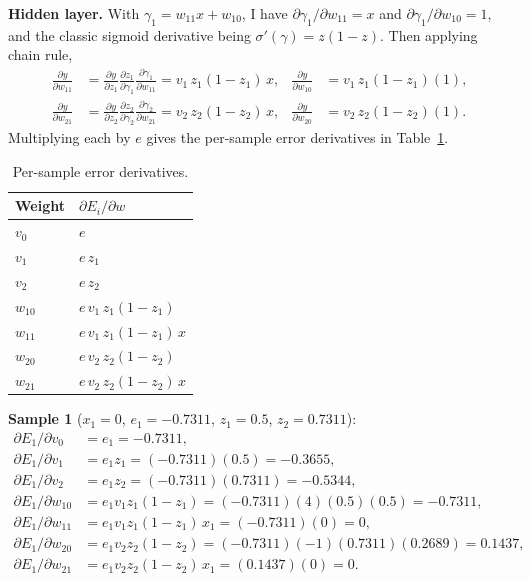 \documentclass[11pt,letterpaper]{article}
\newcommand{\sig}{\sigma}
\newcommand{\pd}[2]{\frac{\partial #1}{\partial #2}}
\begin{document}
\textbf{Hidden layer.} With $\gamma_1=w_{11}x+w_{10}$, I have
$\partial\gamma_1/\partial w_{11}=x$ and $\partial\gamma_1/\partial w_{10}=1$,
and the classic sigmoid derivative being $\sig'(\gamma)=z(1-z)$. Then applying chain rule,
\begin{align*}
\pd{y}{w_{11}}&=\pd{y}{z_1}\pd{z_1}{\gamma_1}\pd{\gamma_1}{w_{11}}
=v_1\,z_1(1-z_1)\,x,
&\pd{y}{w_{10}}&=v_1\,z_1(1-z_1)(1),\\[3pt]
\pd{y}{w_{21}}&=\pd{y}{z_2}\pd{z_2}{\gamma_2}\pd{\gamma_2}{w_{21}}
=v_2\,z_2(1-z_2)\,x,
&\pd{y}{w_{20}}&=v_2\,z_2(1-z_2)(1).
\end{align*}
Multiplying each by $e$ gives the per-sample error derivatives in
Table~\ref{tab:formulas}.

\begin{table}[H]
\centering
\caption{Per-sample error derivatives.}
\label{tab:formulas}
\renewcommand{\arraystretch}{1.35}
\begin{tabular}{ll}
\toprule
Weight & $\partial E_i/\partial w$\\
\midrule
$v_0$    & $e$\\
$v_1$    & $e\,z_1$\\
$v_2$    & $e\,z_2$\\
$w_{10}$ & $e\,v_1\,z_1(1-z_1)$\\
$w_{11}$ & $e\,v_1\,z_1(1-z_1)\,x$\\
$w_{20}$ & $e\,v_2\,z_2(1-z_2)$\\
$w_{21}$ & $e\,v_2\,z_2(1-z_2)\,x$\\
\bottomrule
\end{tabular}
\end{table}

\textbf{Sample 1} ($x_1=0$, $e_1=-0.7311$, $z_1=0.5$, $z_2=0.7311$):
\begin{align*}
\partial E_1/\partial v_0&=e_1=-0.7311,\\
\partial E_1/\partial v_1&=e_1z_1=(-0.7311)(0.5)=-0.3655,\\
\partial E_1/\partial v_2&=e_1z_2=(-0.7311)(0.7311)=-0.5344,\\
\partial E_1/\partial w_{10}&=e_1v_1z_1(1-z_1)=(-0.7311)(4)(0.5)(0.5)=-0.7311,\\
\partial E_1/\partial w_{11}&=e_1v_1z_1(1-z_1)\,x_1=(-0.7311)(0)=0,\\
\partial E_1/\partial w_{20}&=e_1v_2z_2(1-z_2)=(-0.7311)(-1)(0.7311)(0.2689)=0.1437,\\
\partial E_1/\partial w_{21}&=e_1v_2z_2(1-z_2)\,x_1=(0.1437)(0)=0.
\end{align*}
\end{document}
